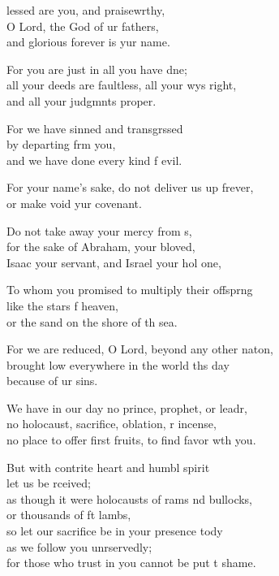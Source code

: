 \settowidth{\versewidth}{no place to offer first fruits, to find favor with you.}
\begin{psalmverse}%
  \begin{patverse}
lessed are you, and praisewrthy,\Flex\\
O Lord, the God of ur fathers,\Med\\
and glorious forever is yur name.

For you are just in all you have dne;\Flex\\
all your deeds are faultless, all your wys right,\Med\\
and all your judgmnts proper.

For we have sinned and transgrssed\Flex\\
by departing frm you,\Med\\
and we have done every kind f evil.

For your name’s sake, do not deliver us up frever,\Med\\
or make void yur covenant.

Do not take away your mercy from s,\Flex\\
for the sake of Abraham, your bloved,\Med\\
Isaac your servant, and Israel your hol one,

To whom you promised to multiply their offspr\pointup{\i}ng\Flex\\
like the stars f heaven,\Med\\
or the sand on the shore of th sea.

For we are reduced, O Lord, beyond any other nat\pointup{\i}on,\Flex\\
brought low everywhere in the world th\pointup{\i}s day\Med\\
because of ur sins.

We have in our day no prince, prophet, or leadr,\Flex\\
no holocaust, sacrifice, oblation, r incense,\Med\\
no place to offer first fruits, to find favor w\pointup{\i}th you.

But with contrite heart and humbl spirit\Med\\
let us be rceived;\\
as though it were holocausts of rams nd bullocks,\Med\\
or thousands of ft lambs,\\
so let our sacrifice be in your presence tody\Flex\\
as we follow you unrservedly;\Med\\
for those who trust in you cannot be put t shame.


\end{patverse}
\end{psalmverse}
